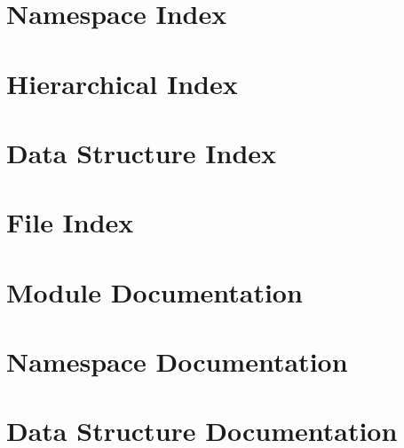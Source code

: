 \let\mypdfximage\pdfximage\def\pdfximage{\immediate\mypdfximage}\documentclass[twoside]{book}
\newcommand{\+}{\discretionary{\mbox{\scriptsize$\hookleftarrow$}}{}{}}
\begin{document}
\chapter{Namespace Index}

\chapter{Hierarchical Index}

\chapter{Data Structure Index}

\chapter{File Index}

\chapter{Module Documentation}

\chapter{Namespace Documentation}

\chapter{Data Structure Documentation}










































\end{document}
